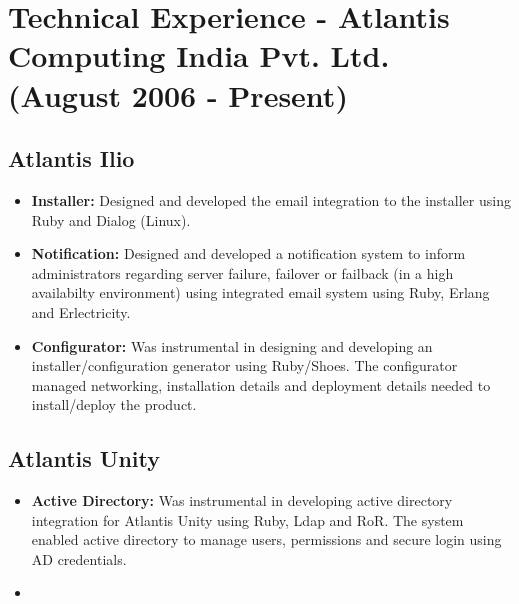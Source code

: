 \documentclass[a4paper,11pt]{article}
\begin{document}
\section{Technical Experience - Atlantis Computing India
  Pvt. Ltd. (August 2006 - Present)}

\subsection{Atlantis Ilio}
\begin{itemize}
  \item[] \textbf{Installer: } Designed and developed the email
    integration to the installer using Ruby and Dialog (Linux).
  \item[] \textbf{Notification: } Designed and developed a
    notification system to inform administrators regarding server
    failure, failover or failback (in a high availabilty environment) using
    integrated email system using Ruby, Erlang and Erlectricity.
  \item[] \textbf{Configurator: }Was instrumental in
    designing and developing an installer/configuration generator
    using Ruby/Shoes. The configurator managed networking,
    installation details and deployment details needed to
    install/deploy the product.
\end{itemize}

\subsection{Atlantis Unity}
\begin{itemize}
  \item[] \textbf{Active Directory: }Was instrumental in developing
    active directory integration for Atlantis Unity using Ruby, Ldap
    and RoR. The system
    enabled active directory to manage users, permissions and secure
    login using AD credentials.
  \item[] \textbf{}
\end{itemize}
\end{document}
